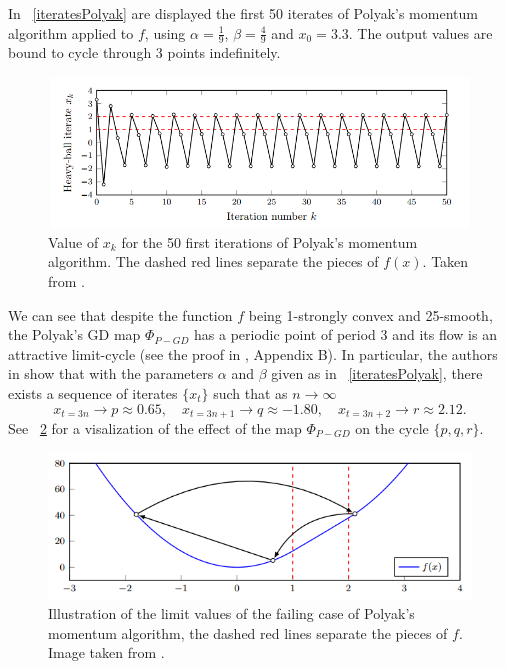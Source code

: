 \documentclass{article}
\begin{document}
In \figurename \ \ref{iteratesPolyak} are displayed the first 50 iterates of Polyak's momentum algorithm applied to $f$, using $\alpha=\frac{1}{9}$, $\beta=\frac{4}{9}$ and $x_0=3.3$. The output values are bound to cycle through 3 points indefinitely.

\begin{figure}
  \centering
   \includegraphics[width=15cm, height=4cm]{images/iterates.png}
  \caption{Value of $x_k$ for the 50 first iterations of Polyak's momentum algorithm. The dashed red lines separate the pieces of $f(x)$. Taken from \citet{2014arXiv1408.3595L}. \label{iteratesPolyak} }
  \label{figIt}
\end{figure}

We can see that despite the function $f$ being 1-strongly convex and 25-smooth, the Polyak's GD map $\Phi_{P-GD}$ has a periodic point of period 3 and its flow is an attractive limit-cycle (see the proof in \cite{2014arXiv1408.3595L}, Appendix B).
In particular, the authors in  \cite{2014arXiv1408.3595L} show that with the parameters $\alpha$ and $\beta$ given as in \figurename \ \ref{iteratesPolyak}, there exists a sequence of iterates $\{x_t\}$ such that as $n\to \infty$
\[
	x_{t=3n} \rightarrow p \approx 0.65, \quad x_{t=3n+1} \rightarrow q  \approx -1.80, \quad x_{t=3n+2} \rightarrow r \approx 2.12.
\]
See \figurename \ \ref{plot3cycle} for  a visalization of the effect of the map $\Phi_{P-GD}$ on the cycle $\{p,q,r\}$.

\begin{figure}[h]
  \centering
  \includegraphics[scale=0.5]{images/plot_f.png}
  \caption{Illustration of the limit values of the failing case of Polyak's momentum algorithm, the dashed red lines separate the pieces of $f$. Image taken from \citet{2014arXiv1408.3595L}. \label{plot3cycle}}
\end{figure}
\end{document}
